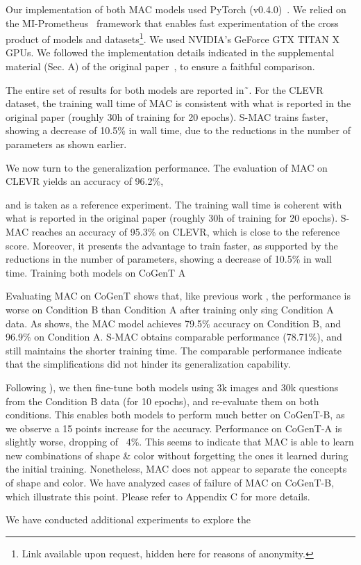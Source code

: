 Our implementation of both MAC models used PyTorch (v0.4.0)~\cite{paszke2017automatic}. We relied on the MI-Prometheus~\cite{kornuta2018accelerating} framework that enables fast experimentation of the cross product of models and datasets\footnote{Link available upon request, hidden here for reasons of anonymity.}. %
We used NVIDIA's GeForce GTX TITAN X GPUs. We followed the implementation details indicated in the supplemental material (Sec. A) of the original paper~\cite{hudson2018compositional}, to ensure a faithful comparison.

The entire set of results for both models are reported in˜. 
For the CLEVR dataset, the training wall time of MAC is consistent with what is reported in the original paper (roughly 30h of training for 20 epochs).
S-MAC trains faster, showing a decrease of 10.5\% in wall time, due to the reductions in the 
number of parameters as shown earlier.

We now turn to the generalization performance. 
The evaluation of MAC on CLEVR yields an accuracy of 96.2\%, 



 and is taken as a reference experiment. The training wall time is coherent with what is reported in the original paper (roughly 30h of training for 20 epochs).
S-MAC reaches an accuracy of 95.3\% on CLEVR, which is close to the reference score. Moreover, it presents the advantage to train faster, as supported by the reductions in the number of parameters, showing a decrease of 10.5\% in wall time.
Training both models on CoGenT A 

Evaluating MAC on CoGenT shows that, like previous work \cite{johnson2017inferring, mascharka2018transparency}, the performance is worse on Condition B than Condition A after training only sing Condition A data. As  shows, the MAC model achieves 79.5\% accuracy on Condition B, and 96.9\% on Condition A. S-MAC obtains comparable performance (78.71\%), and still maintains the shorter training time. The comparable performance indicate that the simplifications did not hinder its generalization capability.

Following \cite{johnson2017inferring, perez2017film}), we then fine-tune both models using 3k images and 30k questions from the Condition B data (for 10 epochs), and re-evaluate them on both conditions. This enables both models to perform much better on CoGenT-B, as we observe a 15 points increase for the accuracy. Performance on CoGenT-A is slightly worse, dropping of ~4\%. This seems to indicate that MAC is able to learn new combinations of shape \& color without forgetting the ones it learned during the initial training.
Nonetheless, MAC does not appear to separate the concepts of shape and color. We have analyzed cases of failure of MAC on CoGenT-B, which illustrate this point. Please refer to Appendix C for more details.

We have conducted additional experiments to explore the 

